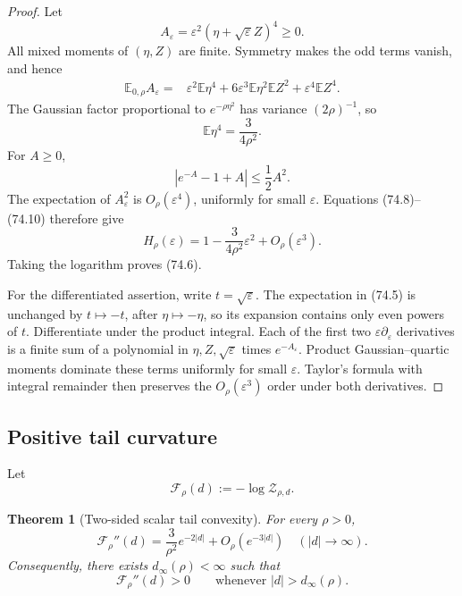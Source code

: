 \documentclass[11pt]{article}
\newtheorem{theorem}{Theorem}[section]
\theoremstyle{remark}
\begin{document}
\begin{proof}
Let
\[
 A_\varepsilon
 =\varepsilon^2(\eta+\sqrt\varepsilon Z)^4\geq0. \tag{74.7}
\]
All mixed moments of \((\eta,Z)\) are finite.  Symmetry makes the odd
terms vanish, and hence
\[
\begin{aligned}
 \mathbb E_{0,\rho}A_\varepsilon
 ={}&\varepsilon^2\mathbb E\eta^4
 +6\varepsilon^3\mathbb E\eta^2\mathbb EZ^2
 +\varepsilon^4\mathbb EZ^4.                    \tag{74.8}
\end{aligned}
\]
The Gaussian factor proportional to \(e^{-\rho\eta^2}\) has variance
\((2\rho)^{-1}\), so
\[
 \mathbb E\eta^4=\frac{3}{4\rho^2}.              \tag{74.9}
\]
For \(A\geq0\),
\[
 |e^{-A}-1+A|\leq\frac12A^2.                     \tag{74.10}
\]
The expectation of \(A_\varepsilon^2\) is
\(O_\rho(\varepsilon^4)\), uniformly for small \(\varepsilon\).
Equations (74.8)--(74.10) therefore give
\[
 H_\rho(\varepsilon)
 =1-\frac{3}{4\rho^2}\varepsilon^2
 +O_\rho(\varepsilon^3).                         \tag{74.11}
\]
Taking the logarithm proves (74.6).

For the differentiated assertion, write
\(t=\sqrt\varepsilon\).  The expectation in (74.5) is unchanged by
\(t\mapsto-t\), after \(\eta\mapsto-\eta\), so its expansion contains
only even powers of \(t\).  Differentiate under the product integral.
Each of the first two \(\varepsilon\partial_\varepsilon\) derivatives
is a finite sum of a polynomial in \(\eta,Z,\sqrt\varepsilon\) times
\(e^{-A_\varepsilon}\).  Product Gaussian--quartic moments dominate
these terms uniformly for small \(\varepsilon\).  Taylor's formula
with integral remainder then preserves the
\(O_\rho(\varepsilon^3)\) order under both derivatives.
\end{proof}

\subsection{Positive tail curvature}

Let
\[
 \mathcal F_\rho(d):=-\log\mathcal Z_{\rho,d}.    \tag{74.12}
\]

\begin{theorem}[Two-sided scalar tail convexity]
\label{thm:v17v74-tail}
For every \(\rho>0\),
\[
\boxed{
 \mathcal F_\rho''(d)
 =\frac{3}{\rho^2}e^{-2|d|}
 +O_\rho(e^{-3|d|})
 \quad (|d|\to\infty).}                          \tag{74.13}
\]
Consequently, there exists \(d_\infty(\rho)<\infty\) such that
\[
 \mathcal F_\rho''(d)>0
 \qquad\text{whenever }|d|>d_\infty(\rho).        \tag{74.14}
\]
\end{theorem}
\end{document}
